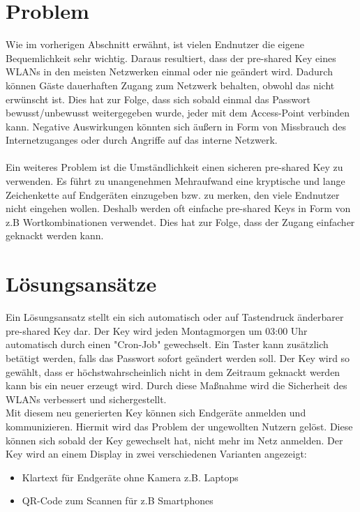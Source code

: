 \documentclass[a4paper,11pt,singlespacing]{article}
\begin{document}
	\section{Problem}
	Wie im vorherigen Abschnitt erwähnt, ist vielen Endnutzer die eigene Bequemlichkeit sehr wichtig. Daraus resultiert, dass der pre-shared Key eines WLANs in den meisten Netzwerken einmal oder nie geändert wird. Dadurch können Gäste dauerhaften Zugang zum Netzwerk behalten, obwohl das nicht erwünscht ist.  
	Dies hat zur Folge, dass sich sobald einmal das Passwort  bewusst/unbewusst weitergegeben wurde, jeder mit dem Access-Point verbinden kann. Negative Auswirkungen könnten sich äußern in Form von Missbrauch des Internetzuganges oder durch Angriffe auf das interne Netzwerk. \\ \\ 
	Ein weiteres Problem ist die Umständlichkeit einen sicheren pre-shared Key zu verwenden. Es führt zu unangenehmen Mehraufwand eine kryptische und lange Zeichenkette auf Endgeräten einzugeben bzw. zu merken, den viele Endnutzer nicht eingehen wollen. Deshalb werden oft einfache pre-shared Keys in Form von z.B Wortkombinationen verwendet. Dies hat zur Folge, dass der Zugang einfacher geknackt werden kann.
	
	\section{Lösungsansätze}
	Ein Lösungsansatz stellt ein sich automatisch oder auf Tastendruck änderbarer pre-shared Key dar. Der Key wird jeden Montagmorgen um 03:00 Uhr automatisch durch einen "Cron-Job" gewechselt. Ein Taster kann zusätzlich betätigt werden, falls das Passwort sofort geändert werden soll.
	Der Key wird so gewählt, dass er höchstwahrscheinlich nicht in dem Zeitraum geknackt werden kann bis ein neuer erzeugt wird. Durch diese Maßnahme wird die Sicherheit des WLANs verbessert und sichergestellt. \\
	Mit diesem neu generierten Key können sich Endgeräte anmelden und kommunizieren. Hiermit wird das Problem der ungewollten Nutzern gelöst. Diese können sich sobald der Key gewechselt hat, nicht mehr im Netz anmelden. Der Key wird an einem Display in zwei verschiedenen Varianten angezeigt:
	\begin{itemize}
		\item Klartext für Endgeräte ohne Kamera z.B. Laptops
		\item QR-Code zum Scannen für z.B Smartphones
	\end{itemize}
\end{document}
